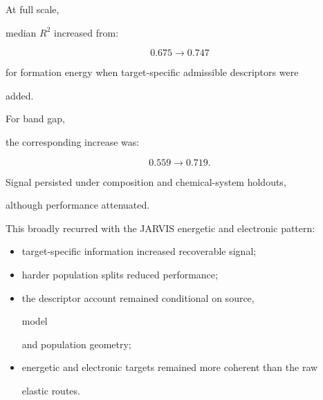 \documentclass[11pt,a4paper,oneside]{report}
\providecommand{\Rtwo}{\ensuremath{R^2}}
\begin{document}
At full scale,

median \Rtwo{} increased from:



\begin{equation}
0.675
\rightarrow
0.747
\end{equation}



for formation energy when target-specific admissible descriptors were

added.



For band gap,

the corresponding increase was:



\begin{equation}
0.559
\rightarrow
0.719.
\end{equation}



Signal persisted under composition and chemical-system holdouts,

although performance attenuated.



This broadly recurred with the JARVIS energetic and electronic pattern:



\begin{itemize}



\item

target-specific information increased recoverable signal;



\item

harder population splits reduced performance;



\item

the descriptor account remained conditional on source,

model

and population geometry;



\item

energetic and electronic targets remained more coherent than the raw

elastic routes.



\end{itemize}
\end{document}
